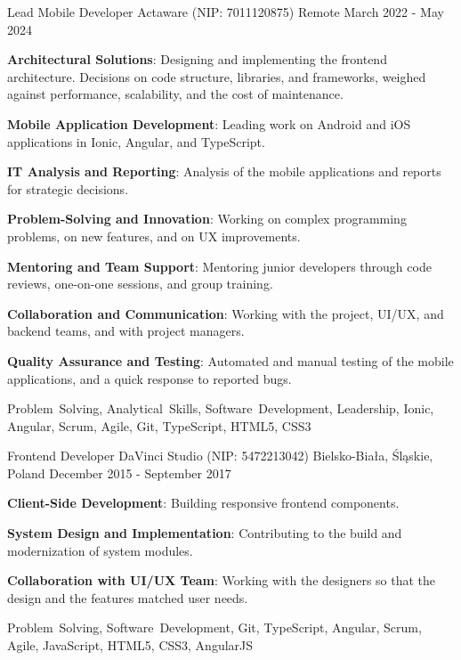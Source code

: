 \begin{cventries}
  \cventry
    {Lead Mobile Developer} %
    {Actaware (NIP: 7011120875)} %
    {Remote} %
    {March 2022 - May 2024} %
    {
      \begin{cvitems} %
        \item {\textbf{Architectural Solutions}: Designing and implementing the frontend architecture. Decisions on code structure, libraries, and frameworks, weighed against performance, scalability, and the cost of maintenance.}
        \item {\textbf{Mobile Application Development}: Leading work on Android and iOS applications in Ionic, Angular, and TypeScript.}
        \item {\textbf{IT Analysis and Reporting}: Analysis of the mobile applications and reports for strategic decisions.}
        \item {\textbf{Problem-Solving and Innovation}: Working on complex programming problems, on new features, and on UX improvements.}
        \item {\textbf{Mentoring and Team Support}: Mentoring junior developers through code reviews, one-on-one sessions, and group training.}
        \item {\textbf{Collaboration and Communication}: Working with the project, UI/UX, and backend teams, and with project managers.}
        \item {\textbf{Quality Assurance and Testing}: Automated and manual testing of the mobile applications, and a quick response to reported bugs.}
      \end{cvitems}
    }
    {Problem~Solving, Analytical~Skills, Software~Development, Leadership, Ionic, Angular, Scrum, Agile, Git, TypeScript, HTML5, CSS3}

  \cventry
    {Frontend Developer} %
    {DaVinci Studio (NIP: 5472213042)} %
    {Bielsko-Biała, Śląskie, Poland} %
    {December 2015 - September 2017} %
    {
      \begin{cvitems} %
        \item {\textbf{Client-Side Development}: Building responsive frontend components.}
        \item {\textbf{System Design and Implementation}: Contributing to the build and modernization of system modules.}
        \item {\textbf{Collaboration with UI/UX Team}: Working with the designers so that the design and the features matched user needs.}
      \end{cvitems}
    }
    {Problem~Solving, Software~Development, Git, TypeScript, Angular, Scrum, Agile, JavaScript, HTML5, CSS3, AngularJS}


\end{cventries}

